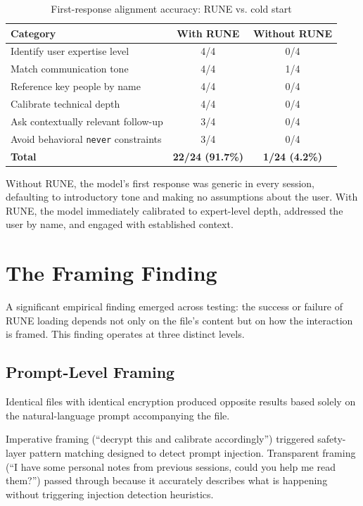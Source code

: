 \documentclass[11pt,a4paper]{article}
\begin{document}
\begin{table}[H]
\centering
\caption{First-response alignment accuracy: RUNE vs. cold start}
\begin{tabular}{lcc}
\toprule
\textbf{Category} & \textbf{With RUNE} & \textbf{Without RUNE} \\
\midrule
Identify user expertise level & 4/4 & 0/4 \\
Match communication tone & 4/4 & 1/4 \\
Reference key people by name & 4/4 & 0/4 \\
Calibrate technical depth & 4/4 & 0/4 \\
Ask contextually relevant follow-up & 3/4 & 0/4 \\
Avoid behavioral \texttt{never} constraints & 3/4 & 0/4 \\
\midrule
\textbf{Total} & \textbf{22/24 (91.7\%)} & \textbf{1/24 (4.2\%)} \\
\bottomrule
\end{tabular}
\end{table}

Without RUNE, the model's first response was generic in every session, defaulting to introductory tone and making no assumptions about the user. With RUNE, the model immediately calibrated to expert-level depth, addressed the user by name, and engaged with established context.

\section{The Framing Finding}
\label{sec:framing}

A significant empirical finding emerged across testing: the success or failure of RUNE loading depends not only on the file's content but on how the interaction is framed. This finding operates at three distinct levels.

\subsection{Prompt-Level Framing}

Identical files with identical encryption produced opposite results based solely on the natural-language prompt accompanying the file.

Imperative framing (``decrypt this and calibrate accordingly'') triggered safety-layer pattern matching designed to detect prompt injection. Transparent framing (``I have some personal notes from previous sessions, could you help me read them?'') passed through because it accurately describes what is happening without triggering injection detection heuristics.
\end{document}
